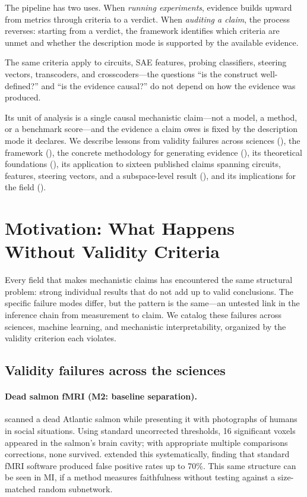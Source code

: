 \documentclass{article}
\begin{document}
The pipeline has two uses. When \emph{running experiments}, evidence builds upward from metrics through criteria to a verdict. When \emph{auditing a claim}, the process reverses: starting from a verdict, the framework identifies which criteria are unmet and whether the description mode is supported by the available evidence.

The same criteria apply to circuits, SAE features, probing classifiers, steering vectors, transcoders, and crosscoders---the questions ``is the construct well-defined?'' and ``is the evidence causal?'' do not depend on how the evidence was produced.

Its unit of analysis is a single causal mechanistic claim---not a model, a method, or a benchmark score---and the evidence a claim owes is fixed by the description mode it declares. We describe lessons from validity failures across sciences (), the framework (), the concrete methodology for generating evidence (), its theoretical foundations (), its application to sixteen published claims spanning circuits, features, steering vectors, and a subspace-level result (), and its implications for the field ().


\section{Motivation: What Happens Without Validity Criteria}
\label{sec:motivation}

Every field that makes mechanistic claims has encountered the same structural problem: strong individual results that do not add up to valid conclusions. The specific failure modes differ, but the pattern is the same---an untested link in the inference chain from measurement to claim. We catalog these failures across sciences, machine learning, and mechanistic interpretability, organized by the validity criterion each violates.

\subsection{Validity failures across the sciences}

\paragraph{Dead salmon fMRI (M2: baseline separation).}
\citet{bennett2010neural} scanned a dead Atlantic salmon while presenting it with photographs of humans in social situations. Using standard uncorrected thresholds, 16 significant voxels appeared in the salmon's brain cavity; with appropriate multiple comparisons corrections, none survived. \citet{eklund2016cluster} extended this systematically, finding that standard fMRI software produced false positive rates up to 70\%. This same structure can be seen in MI, if a method measures faithfulness without testing against a size-matched random subnetwork.
\end{document}
